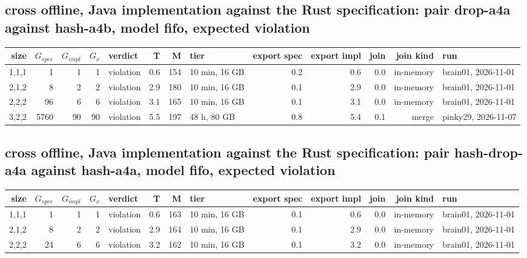 \documentclass[10pt]{article}
\begin{document}
\subsection*{cross offline, Java implementation against the Rust specification: pair \textsf{drop-a4a} against \textsf{hash-a4b}, model fifo, expected violation}
\begin{longtable}{@{}rrrrlrrlrrrrl@{}}
\toprule
size & $G_{\mathit{spec}}$ & $G_{\mathit{impl}}$ & $G_x$ & verdict & T & M & tier & export spec & export impl & join & join kind & run \\
\midrule
\endhead
\color{red} 1,1,1 & 1 & 1 & 1 & violation & 0.6 & 154 & 10 min, 16 GB & 0.2 & 0.6 & 0.0 & in-memory & brain01, 2026-11-01 \\
\color{red} 2,1,2 & 8 & 2 & 2 & violation & 2.9 & 180 & 10 min, 16 GB & 0.1 & 2.9 & 0.0 & in-memory & brain01, 2026-11-01 \\
\color{red} 2,2,2 & 96 & 6 & 6 & violation & 3.1 & 165 & 10 min, 16 GB & 0.1 & 3.1 & 0.0 & in-memory & brain01, 2026-11-01 \\
\color{red} 3,2,2 & 5760 & 90 & 90 & violation & 5.5 & 197 & 48 h, 80 GB & 0.8 & 5.4 & 0.1 & merge & pinky29, 2026-11-07 \\
\bottomrule
\end{longtable}
\subsection*{cross offline, Java implementation against the Rust specification: pair \textsf{hash-drop-a4a} against \textsf{hash-a4a}, model fifo, expected violation}
\begin{longtable}{@{}rrrrlrrlrrrrl@{}}
\toprule
size & $G_{\mathit{spec}}$ & $G_{\mathit{impl}}$ & $G_x$ & verdict & T & M & tier & export spec & export impl & join & join kind & run \\
\midrule
\endhead
\color{red} 1,1,1 & 1 & 1 & 1 & violation & 0.6 & 163 & 10 min, 16 GB & 0.1 & 0.6 & 0.0 & in-memory & brain01, 2026-11-01 \\
\color{red} 2,1,2 & 8 & 2 & 2 & violation & 2.9 & 164 & 10 min, 16 GB & 0.1 & 2.9 & 0.0 & in-memory & brain01, 2026-11-01 \\
\color{red} 2,2,2 & 24 & 6 & 6 & violation & 3.2 & 162 & 10 min, 16 GB & 0.1 & 3.2 & 0.0 & in-memory & brain01, 2026-11-01 \\
\bottomrule
\end{longtable}
\end{document}
